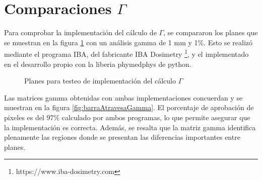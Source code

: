 \section{Comparaciones $\Gamma$}

Para comprobar la implementación del cálculo de $\Gamma$, se compararon los planes que se muestran en la figura \ref{fig:barraAtravesa} con un análisis gamma de 1 mm y 1\%. Esto se realizó mediante el programa IBA, del fabricante IBA Dosimetry \footnote{https://www.iba-dosimetry.com}, y el implementado en el desarrollo propio con la liberia phymedphys de python.

\begin{figure}[H]
	\centering
	\hfill
	\caption{Planes para testeo de implementación del cálculo $\Gamma$}
	\label{fig:barraAtravesa}
\end{figure}

Las matrices gamma obtenidas con ambas implementaciones concuerdan y se muestran en la figura \ref{fig:barraAtravesaGamma}. El porcentaje de aprobación de pixeles es del 97\% calculado por ambos programas, lo que permite asegurar que la implementación es correcta. Además, se resalta que la matriz gamma identifica plenamente las regiones donde se presentan las diferencias importantes entre planes. 

